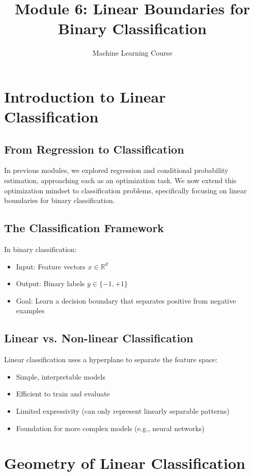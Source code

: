 \documentclass{article}
\title{Module 6: Linear Boundaries for Binary Classification}
\author{Machine Learning Course}
\date{}
\begin{document}
\maketitle
\tableofcontents
\newpage

\section{Introduction to Linear Classification}

\subsection{From Regression to Classification}
In previous modules, we explored regression and conditional probability estimation, approaching each as an optimization task. We now extend this optimization mindset to classification problems, specifically focusing on linear boundaries for binary classification.

\subsection{The Classification Framework}
In binary classification:
\begin{itemize}
    \item Input: Feature vectors $x \in \mathbb{R}^d$
    \item Output: Binary labels $y \in \{-1, +1\}$
    \item Goal: Learn a decision boundary that separates positive from negative examples
\end{itemize}

\subsection{Linear vs. Non-linear Classification}
Linear classification uses a hyperplane to separate the feature space:
\begin{itemize}
    \item Simple, interpretable models
    \item Efficient to train and evaluate
    \item Limited expressivity (can only represent linearly separable patterns)
    \item Foundation for more complex models (e.g., neural networks)
\end{itemize}

\section{Geometry of Linear Classification}
\end{document}
